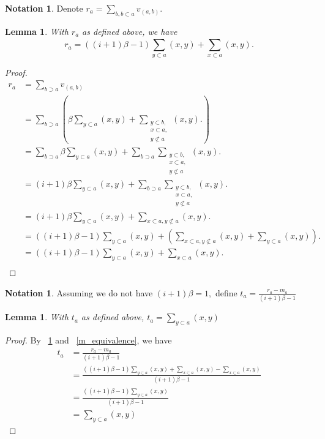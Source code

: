\documentclass[10 pt]{amsart}
\theoremstyle{plain}
\newtheorem{lem}[thm]{Lemma}
\theoremstyle{definition}
\newtheorem{note}[thm]{Notation}
\theoremstyle{remark}
\numberwithin{equation}{section}
\begin{document}
\begin{note}
Denote $r_a = \sum_{b,b\subset a}^{} v_{(a, b)}.$
\end{note}

\begin{lem}
\label{r_equivalence}
With $r_a$ as defined above, we have 
$$r_a = ((i+1)\beta-1)\sum_{y\subset a}^{}(x, y) +\sum_{x\subset a}^{}(x,y).$$
\end{lem}
\begin{proof}
\begin{align*}
	r_a &= \sum_{b\supset a}^{}v_{(a, b)}\\
	&=\sum_{b\supset a}^{} \left(\beta \sum_{y \subset a}^{}(x, y) + \sum_{\substack{{y\subset b,}\\{x \subset a,}\\{y\not\subset a}}}^{}(x, y).\right)\\
	&= \sum_{b\supset a}^{} \beta \sum_{y \subset a}^{}(x, y) + \sum_{b\supset a}^{} \sum_{\substack{{y\subset b,}\\{x \subset a,}\\{y\not\subset a}}}^{}(x, y).\\
	&= (i+1)\beta \sum_{y \subset a}^{}(x, y) + \sum_{b\supset a}^{} \sum_{\substack{{y\subset b,}\\{x \subset a,}\\{y\not\subset a}}}^{}(x, y).\\
	&= (i+1)\beta \sum_{y \subset a}^{}(x, y) + \sum_{x \subset a,y\not\subset a}^{}(x, y).\\
	&= ((i+1)\beta-1) \sum_{y \subset a}^{}(x, y) + \left( \sum_{x \subset a,y\not\subset a}^{}(x, y)+\sum_{y \subset a}^{}(x, y)\right).\\
	&= ((i+1)\beta-1) \sum_{y \subset a}^{}(x, y) + \sum_{x \subset a}^{}(x, y).\\
\end{align*}
\end{proof}
\begin{note}
Assuming we do not have $(i+1)\beta = 1,$ define $t_a = \frac{r_a - m_a}{(i+1)\beta - 1}$
\end{note}

\begin{lem}
\label{t_equivalence}
With $t_a$ as defined above, $t_a= \sum_{y\subset a}^{}(x, y) $
\end{lem}
\begin{proof}
By ~\ref{r_equivalence} and ~\ref{m_equivalence}, we have
\begin{align*}
	t_a &= \frac{r_a - m_a}{(i+1)\beta - 1}\\
	&= \frac{((i+1)\beta-1)\sum_{y\subset a}^{}(x, y) +\sum_{x\subset a}^{}(x, y)-\sum_{x\subset a}^{}(x, y) }{(i+1)\beta - 1}\\
	&= \frac{((i+1)\beta-1)\sum_{y\subset a}^{}(x, y)}{(i+1)\beta - 1}\\
	&= \sum_{y\subset a}^{}(x, y)
\end{align*}
\end{proof}
\end{document}
